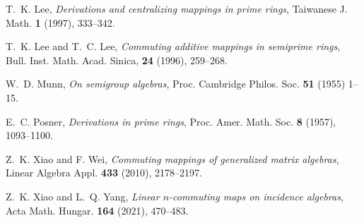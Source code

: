 \documentclass[reqno]{amsart}
\theoremstyle{plain}
\theoremstyle{definition}
\begin{document}
\begin{thebibliography}{}
 T.~K. Lee, {\em Derivations and centralizing mappings in prime rings},
Taiwanese J. Math. {\bf 1} (1997), 333--342.

 T.~K. Lee and T.~C. Lee, {\em Commuting additive mappings in semiprime rings},
Bull. Inst. Math. Acad. Sinica, {\bf 24} (1996), 259--268.

 W.~D. Munn, {\em	On semigroup algebras},
Proc. Cambridge Philos. Soc. {\bf 51} (1955) 1--15.

 E.~C. Posner, {\em Derivations in prime rings},
Proc. Amer. Math. Soc. {\bf 8} (1957), 1093--1100.






 Z.~K. Xiao and F. Wei, {\em Commuting mappings of generalized matrix algebras},
Linear Algebra Appl. {\bf 433} (2010), 2178--2197.

 Z.~K. Xiao and L.~Q. Yang, {\em Linear $n$-commuting maps on incidence algebras}, Acta Math. Hungar. {\bf 164} (2021), 470--483.



\end{thebibliography}
\end{document}
